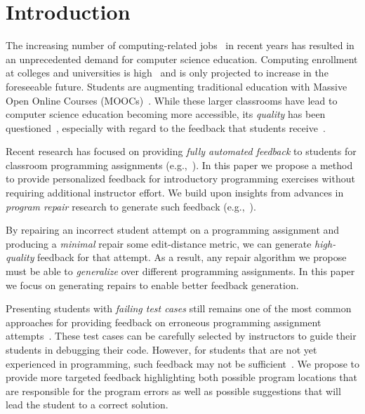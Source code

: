 \section{Introduction}
\label{sec:intro}

The increasing number of computing-related jobs~\citep[][]{compsci-demand} 
in recent years has resulted in an unprecedented
demand for computer science education.  Computing enrollment at colleges
and universities is high~\citep[][]{compsci-classes} and is only projected
to increase in the foreseeable future. Students are augmenting traditional
education with Massive Open Online Courses (MOOCs)~\citep[][]{moocs}.
While these larger classrooms have lead to computer science education 
becoming more accessible, its \emph{quality} has been
questioned~\cite{FIXME}, especially with regard to the feedback that
students receive~\cite{FIXME}. 

Recent research has focused on providing \emph{fully automated feedback} to
students for classroom programming assignments (e.g.,~\cite{FIXME,FIXME}). In
this paper we propose a method to provide personalized
feedback for introductory programming exercises without requiring
additional instructor effort. We build upon insights from advances in
\emph{program repair} research to generate such feedback
(e.g.,~\cite{FIXME,FIXME}). 

By repairing an incorrect student attempt on a programming assignment and
producing a \emph{minimal} repair \wrt some edit-distance metric,
we can generate \emph{high-quality}
feedback for that attempt. As a result, any repair algorithm we propose must be
able to \emph{generalize} over different programming assignments. 
In this paper we focus on generating 
repairs to enable better feedback generation.

Presenting students with \emph{failing test cases} still remains one of the most
common approaches for providing feedback on erroneous programming assignment
attempts~\cite{FIXME,FIXME}. These test cases can be carefully selected by instructors to guide
their students in debugging their code. However, for students that are not yet
experienced in programming, such feedback may not be
sufficient~\cite{FIXME}. We propose to provide 
more targeted feedback highlighting both possible program
locations that are responsible for the program errors as well as possible
suggestions that will lead the student to a correct solution.


